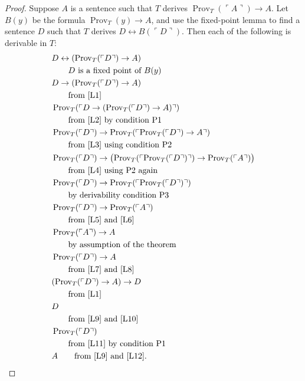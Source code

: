 \begin{proof}
Suppose $A$ is a sentence such that $T$ derives $\operatorname{Prov}_T(\ulcorner A\urcorner)\to A$. Let $B(y)$ be the formula $\operatorname{Prov}_T(y)\to A$, and use the fixed-point lemma to find a sentence $D$ such that $T$ derives $D\leftrightarrow B(\ulcorner D\urcorner)$. Then each of the following is derivable in $T$:
\begin{align}
&D\leftrightarrow(\operatorname{Prov}_T(\ulcorner D\urcorner)\to A)\label{L1}\\
&\qquad\text{$D$ is a fixed point of $B(y)$}\notag\\
&D\to(\operatorname{Prov}_T(\ulcorner D\urcorner)\to A)\label{L2}\\
&\qquad\text{from \eqref{L1}}\notag\\
&\operatorname{Prov}_T(\ulcorner D\to(\operatorname{Prov}_T(\ulcorner D\urcorner)\to A)\urcorner)\label{L3}\\
&\qquad\text{from \eqref{L2} by condition P1}\notag\\
&\operatorname{Prov}_T(\ulcorner D\urcorner)\to\operatorname{Prov}_T(\ulcorner\operatorname{Prov}_T(\ulcorner D\urcorner)\to A\urcorner)\label{L4}\\
&\qquad\text{from \eqref{L3} using condition P2}\notag\\
&\operatorname{Prov}_T(\ulcorner D\urcorner)\to\bigl(\operatorname{Prov}_T(\ulcorner\operatorname{Prov}_T(\ulcorner D\urcorner)\urcorner)\to\operatorname{Prov}_T(\ulcorner A\urcorner)\bigr)\label{L5}\\
&\qquad\text{from \eqref{L4} using P2 again}\notag\\
&\operatorname{Prov}_T(\ulcorner D\urcorner)\to\operatorname{Prov}_T(\ulcorner\operatorname{Prov}_T(\ulcorner D\urcorner)\urcorner)\label{L6}\\
&\qquad\text{by derivability condition P3}\notag\\
&\operatorname{Prov}_T(\ulcorner D\urcorner)\to\operatorname{Prov}_T(\ulcorner A\urcorner)\label{L7}\\
&\qquad\text{from \eqref{L5} and \eqref{L6}}\notag\\
&\operatorname{Prov}_T(\ulcorner A\urcorner)\to A\label{L8}\\
&\qquad\text{by assumption of the theorem}\notag\\
&\operatorname{Prov}_T(\ulcorner D\urcorner)\to A\label{L9}\\
&\qquad\text{from \eqref{L7} and \eqref{L8}}\notag\\
&(\operatorname{Prov}_T(\ulcorner D\urcorner)\to A)\to D\label{L10}\\
&\qquad\text{from \eqref{L1}}\notag\\
&D\label{L11}\\
&\qquad\text{from \eqref{L9} and \eqref{L10}}\notag\\
&\operatorname{Prov}_T(\ulcorner D\urcorner)\label{L12}\\
&\qquad\text{from \eqref{L11} by condition P1}\notag\\
&A\qquad\text{from \eqref{L9} and \eqref{L12}.}\notag
\end{align}
\end{proof}
